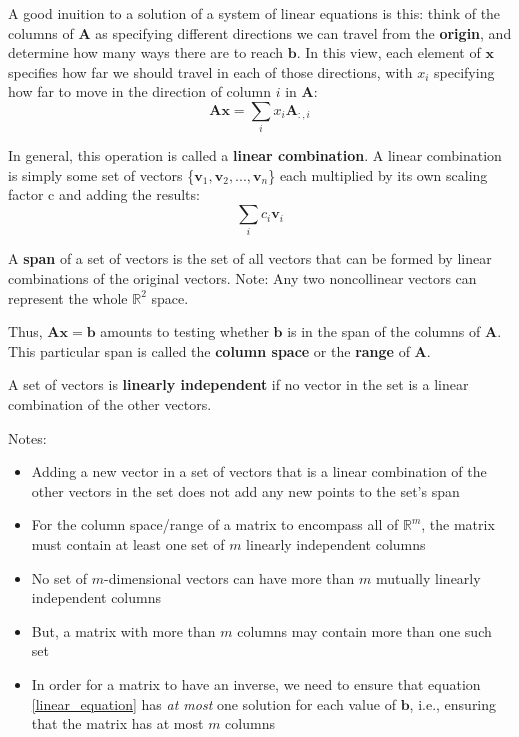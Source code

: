 \documentclass[11pt,twocolumn]{report}
\def\realnumbers{\mathbb{R}}
\begin{document}
A good inuition to a solution of a system of linear equations is this: think of
the columns of $\bm{A}$ as specifying different directions we can travel from
the \textbf{origin}, and determine how many ways there are to reach $\bm{b}$.
In this view, each element of $\bm{x}$ specifies how far we should travel in
each of those directions, with $x_i$ specifying how far to move in the
direction of column $i$ in $\bm{A}$:
\begin{equation}
  \bm{Ax} = \sum_i x_i\bm{A}_{:, i}
\end{equation}

In general, this operation is called a \textbf{linear combination}. A linear
combination is simply some set of vectors \{$\bm{v}_1, \bm{v}_2, ..., \bm{v}_n$\}
each multiplied by its own scaling factor c and adding the results:
\begin{equation}
  \sum_i c_i\bm{v}_i
\end{equation}

A \textbf{span} of a set of vectors is the set of all vectors that can be
formed by linear combinations of the original vectors. 
Note: Any two noncollinear vectors can represent the whole $\realnumbers^2$
space.

Thus, $\bm{Ax} = \bm{b}$ amounts to testing whether $\bm{b}$ is in the span of
the columns of $\bm{A}$. This particular span is called the \textbf{column
  space} or the \textbf{range} of $\bm{A}$.

A set of vectors is \textbf{linearly independent} if no vector in the set is a
linear combination of the other vectors.

Notes:
\begin{itemize}
  \item Adding a new vector in a set of vectors that is a linear combination of
    the other vectors in the set does not add any new points to the set's span
  \item For the column space/range of a matrix to encompass all of
    $\realnumbers^m$, the matrix must contain at least one set of $m$ linearly
    independent columns
  \item No set of $m$-dimensional vectors can have more than $m$ mutually
    linearly independent columns
  \item But, a matrix with more than $m$ columns may contain more than one such
    set
  \item In order for a matrix to have an inverse, we need to ensure that
    equation \ref{linear_equation} has \textit{at most} one solution for each
    value of $\bm{b}$, i.e., ensuring that the matrix has at most $m$ columns
\end{itemize}
\end{document}
